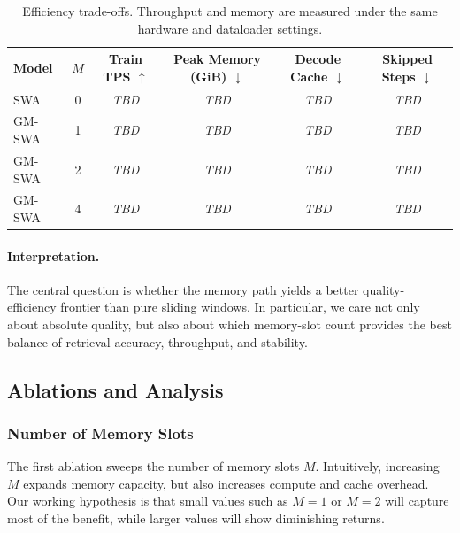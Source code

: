 \documentclass{article}
\newcommand{\model}{GM-SWA}
\newcommand{\baseline}{SWA}
\newcommand{\todoresult}{\textit{TBD}}
\begin{document}
\begin{table}[t]
    \centering
    \caption{Efficiency trade-offs. Throughput and memory are measured under the same hardware and dataloader settings.}
    \label{tab:efficiency}
    \begin{tabular}{lccccc}
        \toprule
        Model & $M$ & Train TPS $\uparrow$ & Peak Memory (GiB) $\downarrow$ & Decode Cache $\downarrow$ & Skipped Steps $\downarrow$ \\
        \midrule
        \baseline & 0 & \todoresult & \todoresult & \todoresult & \todoresult \\
        \model & 1 & \todoresult & \todoresult & \todoresult & \todoresult \\
        \model & 2 & \todoresult & \todoresult & \todoresult & \todoresult \\
        \model & 4 & \todoresult & \todoresult & \todoresult & \todoresult \\
        \bottomrule
    \end{tabular}
\end{table}

\paragraph{Interpretation.}
The central question is whether the memory path yields a better quality-efficiency frontier than pure sliding windows. In particular, we care not only about absolute quality, but also about which memory-slot count provides the best balance of retrieval accuracy, throughput, and stability.

\subsection{Ablations and Analysis}

\subsubsection{Number of Memory Slots}

The first ablation sweeps the number of memory slots $M$. Intuitively, increasing $M$ expands memory capacity, but also increases compute and cache overhead. Our working hypothesis is that small values such as $M=1$ or $M=2$ will capture most of the benefit, while larger values will show diminishing returns.
\end{document}
